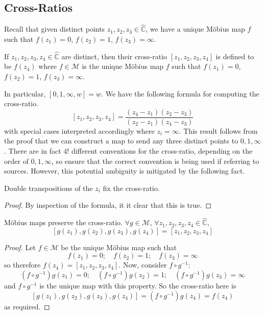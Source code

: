 \subsection{Cross-Ratios}
Recall that given distinct points \(z_1, z_2, z_3 \in \hat{\mathbb C}\), we have a unique M\"obius map \(f\) such that \(f(z_1) = 0\), \(f(z_2) = 1\), \(f(z_3) = \infty\).
\begin{definition}
	If \(z_1, z_2, z_3, z_4 \in \hat{\mathbb C}\) are distinct, then their cross-ratio \([z_1, z_2, z_3, z_4]\) is defined to be \(f(z_4)\) where \(f \in \mathcal M\) is the unique M\"obius map \(f\) such that \(f(z_1) = 0\), \(f(z_2) = 1\), \(f(z_3) = \infty\).
\end{definition}
In particular, \([0, 1, \infty, w] = w\).
We have the following formula for computing the cross-ratio.
\[
	[z_1, z_2, z_3, z_4] = \frac{(z_4 - z_1)(z_2 - z_3)}{(z_2 - z_1)(z_4 - z_3)}
\]
with special cases interpreted accordingly where \(z_i = \infty\).
This result follows from the proof that we can construct a map to send any three distinct points to \(0, 1, \infty\).
There are in fact \(4!
\) different conventions for the cross-ratio, depending on the order of \(0, 1, \infty\), so ensure that the correct convention is being used if referring to sources.
However, this potential ambiguity is mitigated by the following fact.
\begin{proposition}
	Double transpositions of the \(z_i\) fix the cross-ratio.
\end{proposition}
\begin{proof}
	By inspection of the formula, it it clear that this is true.
\end{proof}
\begin{theorem}
	M\"obius maps preserve the cross-ratio.
	\(\forall g \in \mathcal M\), \(\forall z_1, z_2, z_3, z_4 \in \hat{\mathbb C}\),
	\[
		[g(z_1), g(z_2), g(z_3), g(z_4)] = [z_1, z_2, z_3, z_4]
	\]
\end{theorem}
\begin{proof}
	Let \(f \in \mathcal M\) be the unique M\"obius map such that
	\[
		f(z_1) = 0;\quad f(z_2) = 1;\quad f(z_3) = \infty
	\]
	so therefore \(f(z_4) = [z_1, z_2, z_3, z_4]\).
	Now, consider \(f \circ g^{-1}\):
	\[
		(f \circ g^{-1})g(z_1) = 0;\quad (f \circ g^{-1})g(z_2) = 1;\quad (f \circ g^{-1})g(z_3) = \infty
	\]
	and \(f \circ g^{-1}\) is the unique map with this property.
	So the cross-ratio here is
	\[
		[g(z_1), g(z_2), g(z_3), g(z_4)] = (f \circ g^{-1})g(z_4) = f(z_4)
	\]
	as required.
\end{proof}
